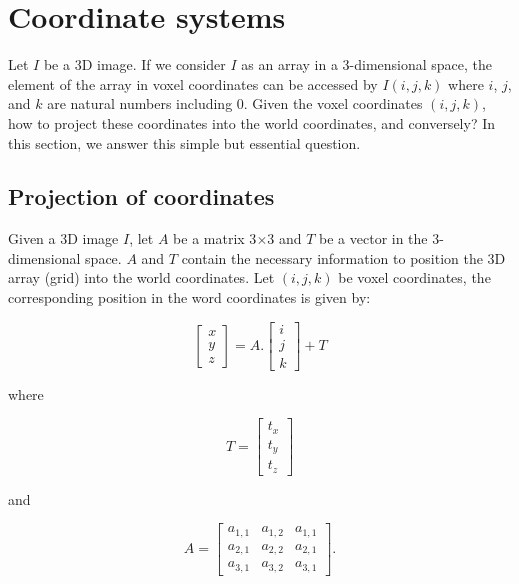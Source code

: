 \section{Coordinate systems}
\label{sec:image:systems}


Let $I$ be a 3D image. If we consider $I$ as an array in a 3-dimensional space, the element of the array in voxel coordinates can be accessed by $I(i,j,k)$ where $i$, $j$, and $k$ are natural numbers including $0$. Given the voxel coordinates $(i,j,k)$, how to project these coordinates into the world coordinates, and conversely? In this section, we answer this simple but essential question.


\subsection{Projection of coordinates}
\label{subsec:images:systems:projection}

Given a 3D image $I$, let $A$ be a matrix 3$\times$3 and $T$ be a vector in the 3-dimensional space. $A$ and $T$ contain the necessary information to position the 3D array (grid) into the world coordinates. Let $(i,j,k)$ be voxel coordinates, the corresponding position in the word coordinates is given by:

\begin{equation}
\begin{bmatrix} x \\ y \\ z \end{bmatrix}
=
A.
\begin{bmatrix} i \\ j \\ k \end{bmatrix}
+ T
\label{eq:projection1}
\end{equation}

where

\begin{equation}
T = \begin{bmatrix} t_x \\ t_y \\ t_z \end{bmatrix}
\end{equation}

and

\begin{equation}
A =
\begin{bmatrix}
a_{1,1} & a_{1,2} & a_{1,1} \\
a_{2,1} & a_{2,2} & a_{2,1} \\
a_{3,1} & a_{3,2} & a_{3,1}
\end{bmatrix}.
\end{equation}



